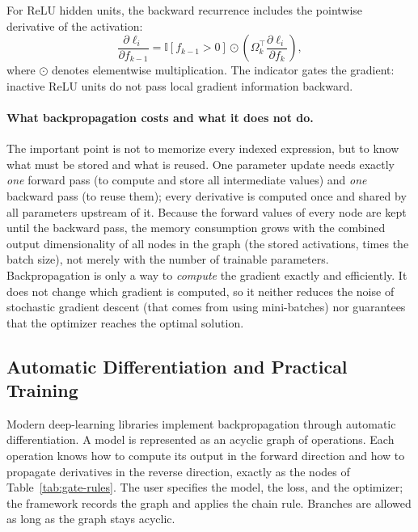 \noindent
For ReLU hidden units, the backward recurrence includes the pointwise derivative
of the activation:
\begin{equation}
  \frac{\partial \ell_i}{\partial f_{k-1}}
  =
  \mathbb{I}[f_{k-1} > 0]
  \odot
  \left(
    \Omega_k^\top
    \frac{\partial \ell_i}{\partial f_k}
  \right),
\end{equation}
\noindent
where $\odot$ denotes elementwise multiplication. The indicator gates the
gradient: inactive ReLU units do not pass local gradient information backward.

\paragraph{What backpropagation costs and what it does not do.}
The important point is not to memorize every indexed expression, but to know
what must be stored and what is reused. One parameter update needs exactly
\emph{one} forward pass (to compute and store all intermediate values) and
\emph{one} backward pass (to reuse them); every derivative is computed once and
shared by all parameters upstream of it. Because the forward values of every
node are kept until the backward pass, the memory consumption grows with the
combined output dimensionality of all nodes in the graph (the stored
activations, times the batch size), not merely with the number of trainable
parameters. Backpropagation is only a way to \emph{compute} the gradient
exactly and efficiently. It does not change which gradient is computed, so it
neither reduces the noise of stochastic gradient descent (that comes from using
mini-batches) nor guarantees that the optimizer reaches the optimal solution.

\subsection{Automatic Differentiation and Practical Training}

Modern deep-learning libraries implement backpropagation through automatic
differentiation. A model is represented as an acyclic graph of operations. Each
operation knows how to compute its output in the forward direction and how to
propagate derivatives in the reverse direction, exactly as the nodes of
Table~\ref{tab:gate-rules}. The user specifies the model, the loss, and the
optimizer; the framework records the graph and applies the chain rule. Branches
are allowed as long as the graph stays acyclic.

